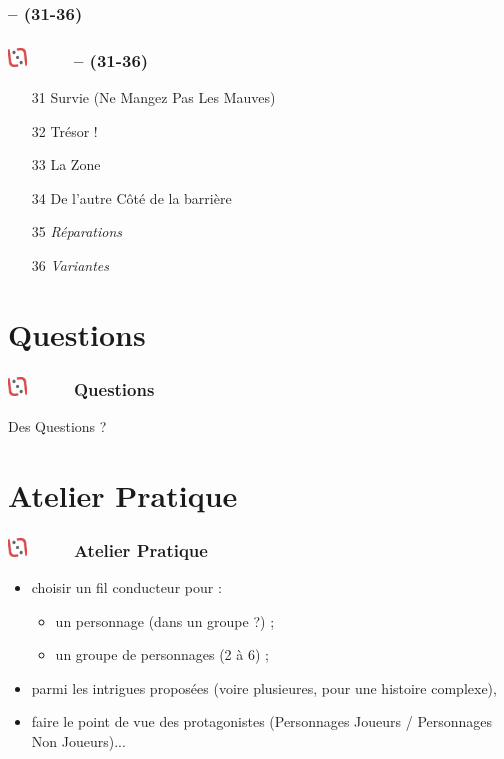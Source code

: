\documentclass[slidetop,11pt]{beamer}
\def\moreInFrameTitleLeftt{\includegraphics[height=0.5cm]{img/ligueludique-0.png}~~~~~}
\begin{document}
\subsubsection{\sectionPartIIbII  -- (31-36)}
\begin{frame}
	\frametitle{\moreInFrameTitleLeftt \sectionPartIIbII  -- (31-36)}
	\begin{enumerate}
		\item[31] Survie (Ne Mangez Pas Les Mauves)
		\item[32] Tr{\'e}sor !
		\item[33] La Zone
		\item[34] De l'autre C{\^o}t{\'e} de la barri{\`e}re
		\item[35] \emph{R{\'e}parations}
		\item[36] \emph{Variantes}
	\end{enumerate}
\end{frame} 


\def\sectionPartIII{Questions}
\section{\sectionPartIII}
\begin{frame}
	\frametitle{\moreInFrameTitleLeftt \sectionPartIII}
	Des Questions ?
\end{frame} 

\def\sectionPartIV{Atelier Pratique}
\section{\sectionPartIV}
\begin{frame}
	\frametitle{\moreInFrameTitleLeftt \sectionPartIV}
	\begin{itemize}
		\item choisir un fil conducteur pour : 
		\begin{itemize}
			\item un personnage (dans un groupe ?) ; 
			\item un groupe de personnages (2 {\`a} 6) ; 
		\end{itemize}
		\item parmi les intrigues propos{\'e}es (voire plusieures, pour une histoire complexe), 
		\item faire le point de vue des protagonistes (Personnages Joueurs / Personnages Non Joueurs)...
	\end{itemize}
\end{frame} 
\end{document}
